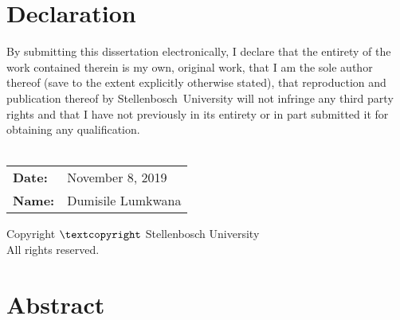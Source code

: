 \TitlePage

\chapter{Declaration}
By submitting this dissertation electronically, I declare that the entirety of the work contained therein is my own, original work, that I am the sole author thereof (save to the extent explicitly otherwise stated), that reproduction and publication thereof by \mbox{Stellenbosch University} will not infringe any third party rights and that I have not \mbox{previously} in its entirety or in part submitted it for obtaining any qualification. \\ \\

\noindent
\begin{tabular}{@{}ll}
\textbf{Date:} & November 8, 2019 \\ 
\textbf{Name:} & Dumisile Lumkwana \\ 
\end{tabular}

\vspace*{\fill}
\begin{center}
Copyright $\textcopyright$ Stellenbosch University \\
All rights reserved.
\end{center}

\chapter{Abstract}

